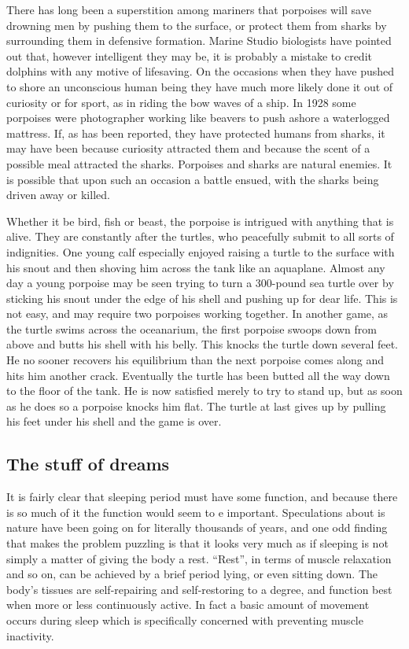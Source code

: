 \documentclass[11pt]{article}
\begin{document}
There has long been a superstition among mariners that porpoises will save drowning men by pushing them to the surface, or protect them from sharks by surrounding them in defensive formation. Marine Studio biologists have pointed out that, however intelligent they may be, it is probably a mistake to credit dolphins with any motive of lifesaving. On the occasions when they have pushed to shore an unconscious human being they have much more likely done it out of curiosity or for sport, as in riding the bow waves of a ship. In 1928 some porpoises were photographer working like beavers to push ashore a waterlogged mattress. If, as has been reported, they have protected humans from sharks, it may have been because curiosity attracted them and because the scent of a possible meal attracted the sharks. Porpoises and sharks are natural enemies. It is possible that upon such an occasion a battle ensued, with the sharks being driven away or killed.

Whether it be bird, fish or beast, the porpoise is intrigued with anything that is alive. They are constantly after the turtles, who peacefully submit to all sorts of indignities. One young calf especially enjoyed raising a turtle to the surface with his snout and then shoving him across the tank like an aquaplane. Almost any day a young porpoise may be seen trying to turn a 300-pound sea turtle over by sticking his snout under the edge of his shell and pushing up for dear life. This is not easy, and may require two porpoises working together. In another game, as the turtle swims across the oceanarium, the first porpoise swoops down from above and butts his shell with his belly. This knocks the turtle down several feet. He no sooner recovers his equilibrium than the next porpoise comes along and hits him another crack. Eventually the turtle has been butted all the way down to the floor of the tank. He is now satisfied merely to try to stand up, but as soon as he does so a porpoise knocks him flat. The turtle at last gives up by pulling his feet under his shell and the game is over.
\subsection{The stuff of dreams}
\label{sec-2-19}

It is fairly clear that sleeping period must have some function, and because there is so much of it the function would seem to e important. Speculations about is nature have been going on for literally thousands of years, and one odd finding that makes the problem puzzling is that it looks very much as if sleeping is not simply a matter of giving the body a rest. ``Rest'', in terms of muscle relaxation and so on, can be achieved by a brief period lying, or even sitting down. The body's tissues are self-repairing and self-restoring to a degree, and function best when more or less continuously active. In fact a basic amount of movement occurs during sleep which is specifically concerned with preventing muscle inactivity.
\end{document}
